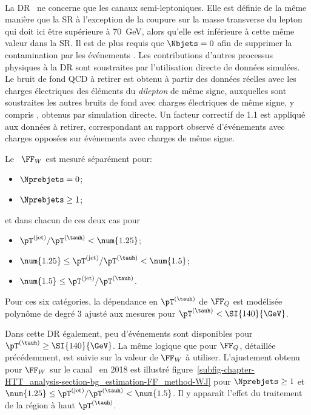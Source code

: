 \paragraph{\Wjets}
La DR \Wjets\ ne concerne que les canaux semi-leptoniques.
Elle est définie de la même manière que la SR à l'exception de la coupure sur la masse transverse du lepton qui doit ici être supérieure à \SI{70}{\GeV}, alors qu'elle est inférieure à cette même valeur dans la SR.
Il est de plus requis que $\Nbjets=0$ afin de supprimer la contamination par les événements \ttbar.
Les contributions d'autres processus physiques à la DR sont soustraites par l'utilisation directe de données simulées.
Le bruit de fond QCD à retirer est obtenu à partir des données réelles avec les charges électriques des éléments du \emph{dilepton} de même signe, auxquelles sont soustraites les autres bruits de fond avec charges électriques de même signe, y compris \Wjets, obtenus par simulation directe.
Un facteur correctif de \num{1.1} est appliqué aux données à retirer, correspondant au rapport observé d'événements avec charges opposées sur événements avec charges de même signe.
\par
Le \fakefactor\ $\FF_W$ est mesuré séparément pour:
\begin{itemize}
\item $\Nprebjets=0$;
\item $\Nprebjets\geq1$;
\end{itemize}
et dans chacun de ces deux cas pour
\begin{itemize}
\item $\pT^{(\text{jet})}/\pT^{(\tauh)} < \num{1.25}$;
\item $\num{1.25} \leq \pT^{(\text{jet})}/\pT^{(\tauh)} < \num{1.5}$;
\item $\num{1.5} \leq \pT^{(\text{jet})}/\pT^{(\tauh)}$.
\end{itemize}
Pour ces six catégories, la dépendance en $\pT^{(\tauh)}$ de $\FF_Q$ est modélisée polynôme de degré 3 ajusté aux mesures pour $\pT^{(\tauh)}<\SI{140}{\GeV}$.
\par
Dans cette DR également, peu d'événements sont disponibles pour $\pT^{(\tauh)}\geq\SI{140}{\GeV}$.
La même logique que pour $\FF_Q$, détaillée précédemment, est suivie sur la valeur de $\FF_W$ à utiliser.
L'ajustement obtenu pour $\FF_W$ sur le canal \mu\tauh\ en 2018 est illustré figure~\ref{subfig-chapter-HTT_analysis-section-bg_estimation-FF_method-WJ} pour $\Nprebjets\geq1$ et $\num{1.25} \leq \pT^{(\text{jet})}/\pT^{(\tauh)} < \num{1.5}$.
Il y apparaît l'effet du traitement de la région à haut $\pT^{(\tauh)}$.
